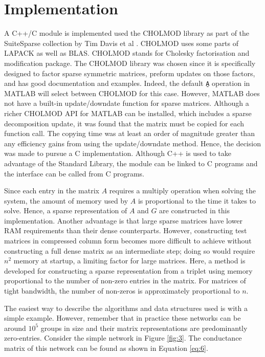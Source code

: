 \documentclass[11pt]{article}
\begin{document}
\section{Implementation}
A C++/C module is implemented used the CHOLMOD library as part of the SuiteSparse collection by Tim Davis et al \cite{ss}. CHOLMOD uses some parts of LAPACK as well as BLAS. CHOLMOD stands for Cholesky factorisation and modification package. The CHOLMOD library was chosen since it is specifically designed to factor sparse symmetric matrices, preform updates on those factors, and has good documentation and examples\cite{CHOLMOD}. Indeed, the default \texttt{A\b} operation in MATLAB will select between CHOLMOD for this case. However, MATLAB does not have a built-in update/downdate function for sparse matrices. Although a richer CHOLMOD API for MATLAB can be installed, which includes a sparse decomposition update, it was found that the matrix must be copied for each function call. The copying time was at least an order of magnitude greater than any efficiency gains from using the update/downdate method. Hence, the decision was made to pursue a C implementation. Although C++ is used to take advantage of the Standard Library, the module can be linked to C programs and the interface can be called from C programs.

Since each entry in the matrix $A$ requires a multiply operation when solving the system, the amount of memory used by $A$ is proportional to the time it takes to solve. Hence, a sparse representation of $A$ and $G$ are constructed in this implementation. Another advantage is that large sparse matrices have lower RAM requirements than their dense counterparts. However, constructing test matrices in compressed column form becomes more difficult to achieve without constructing a full dense matrix as an intermediate step; doing so would require $n^2$ memory at startup, a limiting factor for large matrices. Here, a method is developed for constructing a sparse representation from a triplet using memory proportional to the number of non-zero entries in the matrix. For matrices of tight bandwidth, the number of non-zeros is approximately proportional to $n$.

 The easiest way to describe the algorithms and data structures used is with a simple example. However, remember that in practice these networks can be around $10^5$ groups in size and their matrix representations are predominantly zero-entries. Consider the simple network in Figure \ref{fig:3}. The conductance matrix of this network can be found as shown in Equation \ref{eq:6}.
\end{document}
